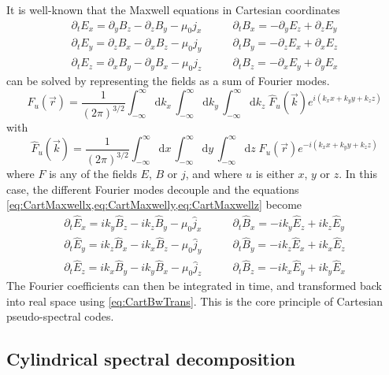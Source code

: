 \documentclass[a4paper]{article}   	%
\newcommand{\Integ}[1]{\int_{-\infty}^{\infty} \!\!\!\!\!
  \mathrm{d}#1}
\begin{document}
It is well-known that the Maxwell equations in Cartesian coordinates 
\begin{align}
\partial_t E_x = \partial_y B_z - \partial_z B_y - \mu_0  j_x \qquad&   
\partial_t B_x = -\partial_y E_z + \partial_z E_y \label{eq:CartMaxwellx} \\
\partial_t E_y = \partial_z B_x - \partial_x B_z - \mu_0  j_y \qquad &   
\partial_t B_y = -\partial_z E_x + \partial_x E_z \label{eq:CartMaxwelly}  \\
\partial_t E_z = \partial_x B_y - \partial_y B_x - \mu_0  j_z \qquad &   
\partial_t B_z = -\partial_x E_y + \partial_y E_x \label{eq:CartMaxwellz} 
\end{align}
can be solved by representing the fields as a sum of Fourier modes.
\begin{equation}
\label{eq:CartBwTrans}
F_u(\vec{r}) = \frac{1}{(2\pi)^{3/2}}\Integ{k_x} \,\Integ{k_y}\, \Integ{k_z} \; \hat{F}_u(\vec{k}) e^{i(k_x x + k_y y + k_z z)} 
\end{equation}
with 
\begin{equation}
\label{eq:CartFwTrans}
\hat{F}_u(\vec{k})  = \frac{1}{(2\pi)^{3/2}}\Integ{x} \,\Integ{y}\, \Integ{z} \; F_u(\vec{r}) e^{-i(k_x x + k_y y + k_z z)} 
\end{equation}
where $F$ is any of the fields $E$, $B$ or $j$, and where $u$ is
either $x$, $y$ or $z$. In this case, the different Fourier modes decouple and the equations \cref{eq:CartMaxwellx,eq:CartMaxwelly,eq:CartMaxwellz} become 
\begin{align}
\partial_t \hat{E}_x = ik_y \hat{B}_z - ik_z \hat{B}_y - \mu_0 \hat{j}_x \qquad &   
\partial_t \hat{B}_x = -ik_y \hat{E}_z + ik_z \hat{E}_y \\
\partial_t \hat{E}_y = ik_z \hat{B}_x - ik_x \hat{B}_z - \mu_0  \hat{j}_y \qquad &   
\partial_t \hat{B}_y = -ik_z \hat{E}_x + ik_x \hat{E}_z \\
\partial_t \hat{E}_z = ik_x \hat{B}_y - ik_y \hat{B}_x - \mu_0 \hat{j}_z  \qquad &   
\partial_t \hat{B}_z = -ik_x \hat{E}_y + ik_y \hat{E}_x 
\end{align}
The Fourier coefficients can then be integrated in time, and
transformed back into real space using \cref{eq:CartBwTrans}. This is
the core principle of Cartesian pseudo-spectral codes.

\subsection{Cylindrical spectral decomposition}
\end{document}
